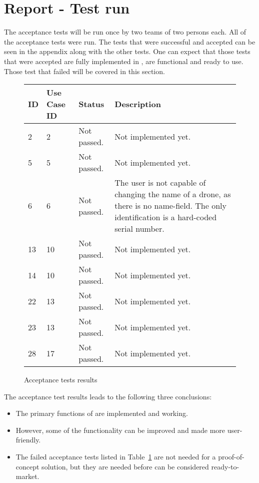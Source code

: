 \section{Report - Test run}
\label{sec:testing_report}

The acceptance tests will be run once by two teams of two persons each. 
All of the acceptance tests were run.
The tests that were successful and accepted can be seen in the appendix along with the other tests.
One can expect that those tests that were accepted are fully implemented in \projectname{}, are functional and ready to use. 
Those test that failed will be covered in this section. \\


\begin{figure}[htb]
\begin{center}
\begin{tabular}{ | l | l | l | p{8cm} | }
  \hline
	\textbf{ID} & \textbf{Use Case ID} & \textbf{Status} & \textbf{Description} \\ \hline
	2 & 2 & Not passed. & Not implemented yet. \\ \hline
	5 & 5 & Not passed. & Not implemented yet. \\ \hline
	6 & 6 & Not passed. & The user is not capable of changing the name of a drone, as there is no name-field. The only identification is a hard-coded serial number. \\ \hline
	13 & 10 & Not passed. & Not implemented yet. \\ \hline
	14 & 10 & Not passed. & Not implemented yet. \\ \hline
	22 & 13 & Not passed. & Not implemented yet. \\ \hline
	23 & 13 & Not passed. & Not implemented yet. \\ \hline
	28 & 17 & Not passed. & Not implemented yet. \\ \hline
  \hline
\end{tabular}
\caption{Acceptance tests results}
\label{tab:acceptance_tests_results_first_run}
\end{center}
\end{figure}

The acceptance test results leads to the following three conclusions:

\begin{itemize}
	\item The primary functions of \projectname{} are implemented and working. 
	\item However, some of the functionality can be improved and made more user-friendly. 
	\item The failed acceptance tests listed in Table~\ref{tab:acceptance_tests_results_first_run} are not needed for a proof-of-concept solution, but they are needed before \projectname{} can be considered ready-to-market.
\end{itemize}


